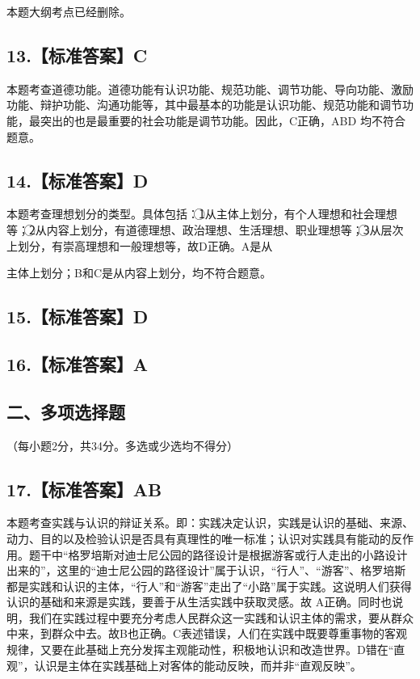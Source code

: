 \documentclass[UTF8,11pt]{ctexart}
\begin{document}
本题大纲考点已经删除。


\subsection*{13.【标准答案】C}

本题考查道德功能。道德功能有认识功能、规范功能、调节功能、导向功能、激励功能、辩护功能、沟通功能等，其中最基本的功能是认识功能、规范功能和调节功能，最突出的也是最重要的社会功能是调节功能。因此，C正确，ABD 均不符合题意。


\subsection*{14.【标准答案】D}

本题考查理想划分的类型。具体包括：\textcircled{1}从主体上划分，有个人理想和社会理想等；\textcircled{2}从内容上划分，有道德理想、政治理想、生活理想、职业理想等；\textcircled{3}从层次上划分，有崇高理想和一般理想等，故D正确。A是从


主体上划分；B和C是从内容上划分，均不符合题意。


\subsection*{15.【标准答案】D}

\subsection*{16.【标准答案】A}

\subsection*{二、多项选择题}

（每小题2分，共34分。多选或少选均不得分）


\subsection*{17.【标准答案】AB}

本题考查实践与认识的辩证关系。即：实践决定认识，实践是认识的基础、来源、动力、目的以及检验认识是否具有真理性的唯一标准；认识对实践具有能动的反作用。题干中“格罗培斯对迪士尼公园的路径设计是根据游客或行人走出的小路设计出来的”，这里的“迪士尼公园的路径设计”属于认识，“行人”、“游客”、格罗培斯都是实践和认识的主体，“行人”和“游客”走出了“小路”属于实践。这说明人们获得认识的基础和来源是实践，要善于从生活实践中获取灵感。故 A正确。同时也说明，我们在实践过程中要充分考虑人民群众这一实践和认识主体的需求，要从群众中来，到群众中去。故B也正确。C表述错误，人们在实践中既要尊重事物的客观规律，又要在此基础上充分发挥主观能动性，积极地认识和改造世界。D错在“直观”，认识是主体在实践基础上对客体的能动反映，而并非“直观反映”。
\end{document}
